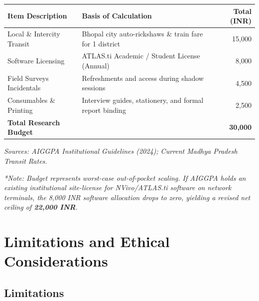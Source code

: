 \documentclass[11pt,a4paper]{article}
\begin{document}
\vspace{0.2cm}
\renewcommand{\arraystretch}{1.4}
\begin{tabularx}{\textwidth}{X >{\raggedleft\arraybackslash}p{4cm} r}
\toprule
\textbf{Item Description} & \textbf{Basis of Calculation} & \textbf{Total (INR)} \\
\midrule
Local \& Intercity Transit & Bhopal city auto-rickshaws \& train fare for 1 district & 15,000 \\
Software Licensing & ATLAS.ti Academic / Student License (Annual) & 8,000 \\
Field Surveys Incidentals & Refreshments and access during shadow sessions & 4,500 \\
Consumables \& Printing & Interview guides, stationery, and formal report binding & 2,500 \\
\midrule
\textbf{Total Research Budget} & & \textbf{30,000} \\
\bottomrule
\end{tabularx}
\vspace{0.1cm}
\small\textit{Sources: AIGGPA Institutional Guidelines (2024); Current Madhya Pradesh Transit Rates.}

\vspace{0.1cm}
\small\textit{*Note: Budget represents worst-case out-of-pocket scaling. If AIGGPA holds an existing institutional site-license for NVivo/ATLAS.ti software on network terminals, the 8,000 INR software allocation drops to zero, yielding a revised net ceiling of \textbf{22,000 INR}.}

\section{Limitations and Ethical Considerations}

\vspace{0.2cm}

\subsection{Limitations}
\end{document}
